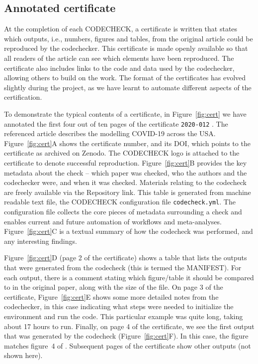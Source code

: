 \documentclass[12pt]{article}
\begin{document}
\subsection*{Annotated certificate}\label{annotated-certificate}

At the completion of each CODECHECK, a certificate is written that
states which outputs, i.e., numbers, figures and tables, from the 
original article could be reproduced by the codechecker.
This certificate is made openly
available so that all readers of the article can see which elements
have been reproduced.  The certificate also includes links to the code
and data used by the codechecker, allowing others to build on the
work.
The format of the certificates has evolved slightly during the
project, as we have learnt to automate different aspects of the
certification.  

To demonstrate the typical contents of a certificate, in
Figure~\ref{fig:cert} we have annotated the first four out of ten
pages of the certificate \texttt{2020-012} \cite{cert-2020-012}.
The referenced article \cite{Unwin2020} describes the modelling COVID-19
across the USA.
Figure~\ref{fig:cert}A shows the certificate number, and its DOI,
which points to the certificate as archived on Zenodo.
The CODECHECK logo is
attached to the certificate to denote successful reproduction.
Figure~\ref{fig:cert}B provides the key metadata about the check --
which paper was checked, who the authors and the codechecker were,
and when it was checked. Materials
relating to the codecheck are freely available via the Repository
link. This table is generated from machine readable text file, the
CODECHECK configuration file \texttt{codecheck.yml}.
The configuration file collects the core pieces of metadata surrounding
a check and enables current and future automation of workflows and 
meta-analyses.
Figure~\ref{fig:cert}C is a textual summary of how the codecheck was
performed, and any interesting findings.

Figure~\ref{fig:cert}D (page 2 of the certificate) shows a table that
lists the outputs that were generated from the codecheck (this is
termed the MANIFEST).  For each output, there is a comment stating
which figure/table it should be compared to in the original paper,
along with the size of the file.  On page 3 of the certificate,
Figure~\ref{fig:cert}E shows some more detailed notes from the
codechecker, in this case indicating what steps were needed to
initialize the environment and run the code.  This particular example
was quite long, taking about 17 hours to run.  Finally, on page 4 of
the certificate, we see the first output that was generated by the
codecheck (Figure~\ref{fig:cert}F).  In this case, the figure matches
figure~4 of \cite{Unwin2020}.  Subsequent pages of the certificate show other
outputs (not shown here).
\end{document}
